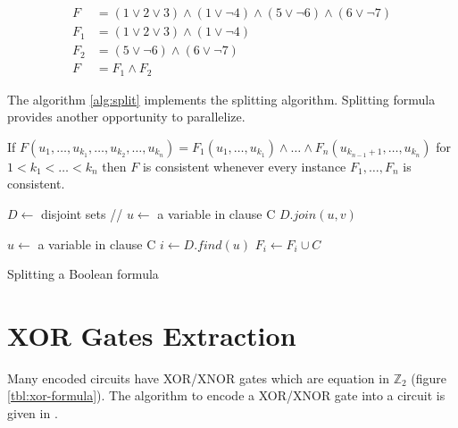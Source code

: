 \begin{align}
  F &= (1 \lor 2 \lor 3) \land (1 \lor \neg 4) \land (5 \lor \neg 6) \land (6 \lor \neg 7) \\
  \label{eqn:split-example}
  F_1 &= (1 \lor 2 \lor 3) \land (1 \lor \neg 4) \\
  F_2 &= (5 \lor \neg 6) \land (6 \lor \neg 7) \\
  F &= F_1 \land F_2
\end{align}

The algorithm \ref{alg:split} implements the splitting algorithm. Splitting formula
provides another opportunity to parallelize.

\begin{myprop}
  If $F(u_1, \ldots, u_{k_1}, \ldots, u_{k_2}, \ldots, u_{k_n})
      = F_1(u_1, \ldots, u_{k_1}) \land \ldots
      \land F_n(u_{k_{n-1}+1}, \ldots, u_{k_n})$
  for $1 < k_1 < \ldots <k_n$ then $F$ is consistent whenever every
  instance $F_1, \ldots, F_n$ is consistent.
\end{myprop}

\begin{algorithm}[h]
  \begin{algorithmic}

    \STATE $D \gets$ disjoint sets // \cite{Tarjan:1975:EGB:321879.321884}
      \STATE $u \gets$ a variable in clause C
        \STATE $D.join(u, v)$
      \ENDFOR
    \ENDFOR

      \STATE $u \gets$ a variable in clause C
      \STATE $i \gets D.find(u)$
      \STATE $F_i \gets F_i \cup C$
    \ENDFOR
  \end{algorithmic}

  \caption{Splitting a Boolean formula}
  \label{alg:split}
\end{algorithm}



\section{XOR Gates Extraction}

Many encoded circuits have XOR/XNOR gates which are equation in
$\mathbb{Z}_2$ (figure \ref{tbl:xor-formula}).  The algorithm
to encode a XOR/XNOR gate into a circuit is given in
\cite{Roy_restoringcircuit}.

